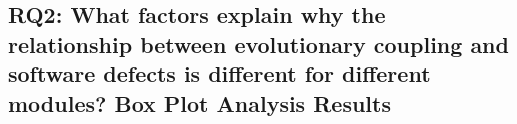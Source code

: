 \documentclass[times]{smrauth}
\begin{document}
%


%
%
%
%




\subsection{RQ2: What factors explain why the relationship between evolutionary coupling and software defects is different for different modules? Box Plot Analysis Results}
\end{document}
